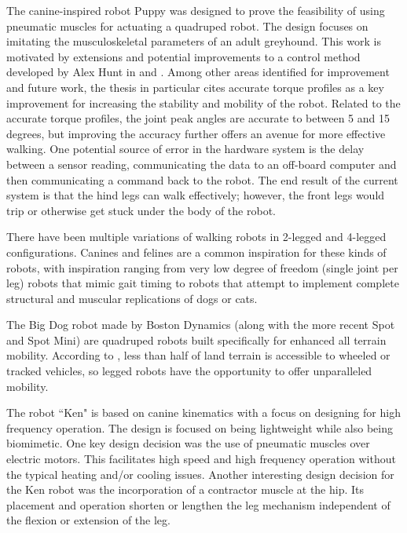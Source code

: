 
The canine-inspired robot Puppy was designed to prove the feasibility of using
pneumatic muscles for actuating a quadruped robot. The design focuses on 
imitating the musculoskeletal parameters of an adult greyhound. 
\cite{PuppyDesign} This work is motivated by extensions and potential
improvements to a control method developed by Alex Hunt in
\cite{HuntPhDThesis} and \cite{HuntHindLegWalking}. Among other areas identified
for improvement and future work, the thesis in particular cites accurate torque
profiles as a key improvement for increasing the stability and mobility of the
robot. Related to the accurate torque profiles, the joint peak angles are
accurate to between 5 and 15 degrees, but improving the accuracy further offers
an avenue for more effective walking. One potential source of error in the
hardware system is the delay between a sensor reading, communicating the data to
an off-board computer and then communicating a command back to the robot. The end
result of the current system is that the hind legs can walk effectively;
however, the front legs would trip or otherwise get stuck under the body of the
robot.


There have been multiple variations of walking robots in 2-legged and 4-legged
configurations. Canines and felines are a common inspiration for these kinds of
robots, with inspiration ranging from very low degree of freedom (single joint
per leg) robots that mimic gait timing to robots that attempt to implement
complete structural and muscular replications of dogs or cats.


The Big Dog robot made by Boston Dynamics (along with the more recent Spot and
Spot Mini) are quadruped robots built specifically for enhanced all terrain
mobility. According to \cite{BigDog}, less than half of land terrain is
accessible to wheeled or tracked vehicles, so legged robots have the opportunity
to offer unparalleled mobility.

The robot ``Ken" is based on canine kinematics with a focus on designing for
high frequency operation. The design is focused on being lightweight while also
being biomimetic. One key design decision was the use of pneumatic muscles over
electric motors. This facilitates high speed and high frequency operation
without the typical heating and/or cooling issues. Another interesting design
decision for the Ken robot was the incorporation of a contractor muscle at the
hip. Its placement and operation shorten or lengthen the leg mechanism
independent of the flexion or extension of the leg.
\cite{Narioka2012}

